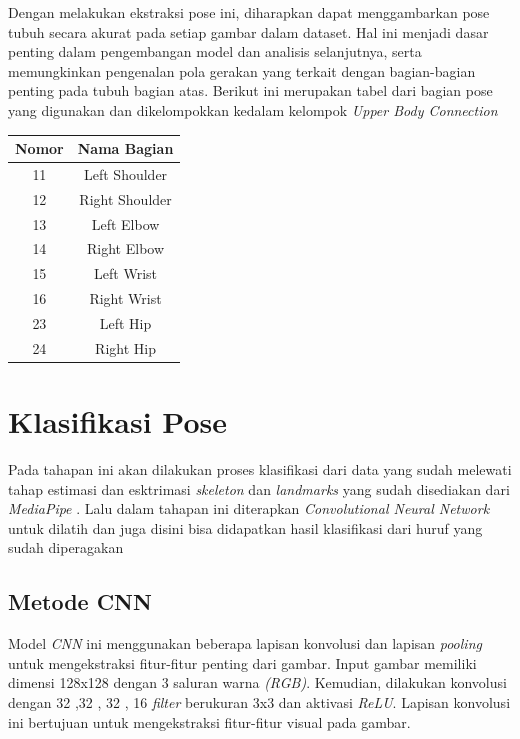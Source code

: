 Dengan melakukan ekstraksi pose ini, diharapkan dapat menggambarkan pose tubuh secara akurat pada setiap gambar dalam dataset. Hal ini menjadi dasar penting dalam pengembangan model dan analisis selanjutnya, serta memungkinkan pengenalan pola gerakan yang terkait dengan bagian-bagian penting pada tubuh bagian atas. Berikut ini merupakan tabel dari bagian pose yang digunakan dan dikelompokkan kedalam kelompok \textit{Upper Body Connection}

\begin{center}
	\begin{table}[hbt!]
		\label{tbl:PoseLandmarks}
		\centering
		\begin{tabular}{cc}
			\hline
			Nomor & Nama Bagian \\
			\hline
			
			11 & Left Shoulder \\
			\hline
			
			12 & Right Shoulder \\
			\hline
			
			13 & Left Elbow \\
			\hline
			
			14 & Right Elbow \\
			\hline
			
			15 & Left Wrist \\
			\hline
			
			16 & Right Wrist \\
			\hline
			
			23 & Left Hip \\
			\hline
			
			24 & Right Hip \\
			\hline
		\end{tabular}
	\end{table}
	\end{center}

\section{Klasifikasi Pose}
Pada tahapan ini akan dilakukan proses klasifikasi dari data yang sudah melewati tahap estimasi dan esktrimasi \textit{skeleton} dan \textit{landmarks} yang sudah disediakan dari \textit{\textit{MediaPipe}} . Lalu dalam tahapan ini  diterapkan \textit{Convolutional Neural Network} untuk dilatih dan juga disini bisa didapatkan hasil klasifikasi dari huruf yang sudah diperagakan


\subsection{Metode CNN}
Model \textit{CNN} ini  menggunakan beberapa lapisan konvolusi dan lapisan \textit{pooling} untuk mengekstraksi fitur-fitur penting dari gambar. Input gambar memiliki dimensi 128x128 dengan 3 saluran warna \textit{(RGB)}. Kemudian, dilakukan konvolusi dengan 32 ,32 , 32 , 16 \textit{filter} berukuran 3x3 dan aktivasi \textit{ReLU}. Lapisan konvolusi ini bertujuan untuk mengekstraksi fitur-fitur visual pada gambar.

